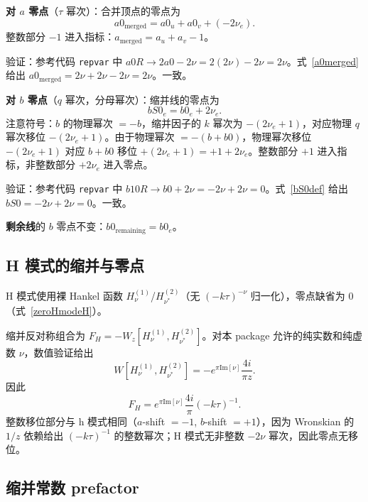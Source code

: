 ﻿\documentclass[a4paper,11pt]{article}
\begin{document}
\textbf{对 $a$ 零点}（$\tau$ 幂次）：合并顶点的零点为
\begin{equation}
  a0_{\text{merged}} = a0_u + a0_v + (-2\nu_e).
  \label{a0merged}
\end{equation}
整数部分 $-1$ 进入指标：$a_{\text{merged}} = a_u + a_v - 1$。

验证：参考代码 \texttt{repvar} 中 $a0R \to 2a0 - 2\nu = 2(2\nu) - 2\nu = 2\nu$。式~\eqref{a0merged} 给出 $a0_{\text{merged}} = 2\nu + 2\nu - 2\nu = 2\nu$。一致。

\textbf{对 $b$ 零点}（$q$ 幂次，分母幂次）：缩并线的零点为
\begin{equation}
  bS0_e = b0_e + 2\nu_e.
  \label{bS0def}
\end{equation}
注意符号：$b$ 的物理幂次 $= -b$，缩并因子的 $k$ 幂次为 $-(2\nu_e+1)$，对应物理 $q$ 幂次移位 $-(2\nu_e+1)$。由于物理幂次 $= -(b + b0)$，物理幂次移位 $-(2\nu_e+1)$ 对应 $b+b0$ 移位 $+(2\nu_e+1) = +1 + 2\nu_e$。整数部分 $+1$ 进入指标，非整数部分 $+2\nu_e$ 进入零点。

验证：参考代码 \texttt{repvar} 中 $b10R \to b0 + 2\nu = -2\nu + 2\nu = 0$。式~\eqref{bS0def} 给出 $bS0 = -2\nu + 2\nu = 0$。一致。

\textbf{剩余线}的 $b$ 零点不变：$b0_{\text{remaining}} = b0_e$。

\subsection{H 模式的缩并与零点}

H 模式使用裸 Hankel 函数 $H_\nu^{(1)}$/$H_{\nu^*}^{(2)}$（无 $(-k\tau)^{-\nu}$ 归一化），零点缺省为 0（式~\eqref{zeroHmodeH}）。

缩并反对称组合为 $F_H=-W_z[H_\nu^{(1)},H_{\nu^*}^{(2)}]$。对本 package 允许的纯实数和纯虚数 $\nu$，数值验证给出
\begin{equation}
  W[H_\nu^{(1)}, H_{\nu^*}^{(2)}] = -e^{\pi\text{Im}[\nu]} \frac{4i}{\pi z}.
\end{equation}
因此
\begin{equation}
  F_H = e^{\pi\text{Im}[\nu]} \frac{4i}{\pi}(-k\tau)^{-1}.
\end{equation}
整数移位部分与 h 模式相同（$a$-shift $= -1$, $b$-shift $= +1$），因为 Wronskian 的 $1/z$ 依赖给出 $(-k\tau)^{-1}$ 的整数幂次；H 模式无非整数 $-2\nu$ 幂次，因此零点无移位。

\subsection{缩并常数 prefactor}
\end{document}
